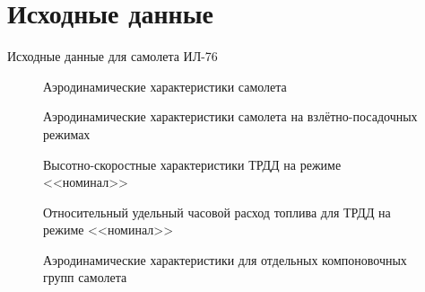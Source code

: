 \section{Исходные данные}
\begin{table}[H]
    \centering
    \caption{Исходные данные для самолета ИЛ-76}
    \label{tab:variant_data}
    
\end{table}

\begin{figure}[H]
\centering
\resizebox{.79\linewidth}{!}{}
\caption{Аэродинамические характеристики самолета}
\label{fig:aero_data}
\end{figure}
\begin{figure}[H]
\centering
\resizebox{.79\linewidth}{!}{}
\caption{Аэродинамические характеристики самолета на взлётно-посадочных режимах}
\label{fig:aero_data_landing}
\end{figure}
\begin{figure}[H]
\centering
\resizebox{.79\linewidth}{!}{}
\caption{Высотно-скоростные характеристики ТРДД на режиме <<номинал>>}
\label{fig:tilda_P_data}
\end{figure}
\begin{figure}[H]
\centering
\resizebox{.79\linewidth}{!}{}
\caption{Относительный удельный часовой расход топлива для ТРДД на режиме <<номинал>>}
\label{fig:tilda_Ce_data}
\end{figure}
\begin{figure}[H]
\centering
\resizebox{.79\linewidth}{!}{}
\caption{Аэродинамические характеристики для отдельных компоновочных групп самолета}
\label{fig:aero_data_elements}
\end{figure}
